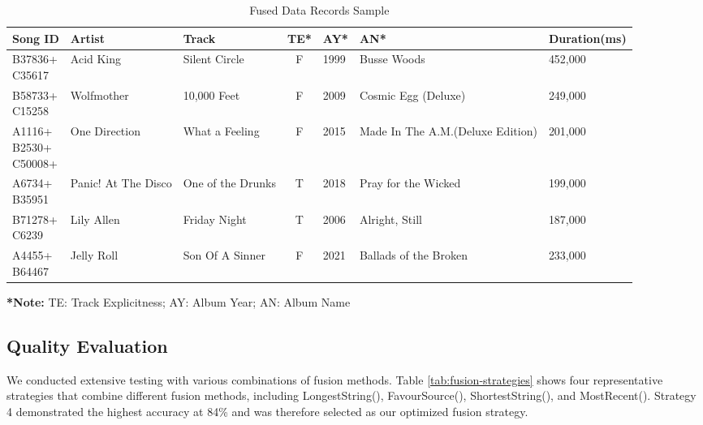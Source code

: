 \documentclass[runningheads]{llncs}
\begin{document}
\begin{table}[h!]
	\footnotesize  
	\centering     
	\renewcommand{\arraystretch}{1.3}
	\caption{Fused Data Records Sample}
	\label{tab:fused-data-samples}
	\begin{threeparttable}
	\begin{tabular}{p{1.5cm}p{1cm}p{1.5cm}cp{1cm}p{2cm}p{2cm}}
	\toprule
	\textbf{\centering Song ID} & \textbf{\centering Artist} & \textbf{\centering Track} & \textbf{\centering TE*} & \textbf{\centering AY*} & \textbf{\centering AN*} & \textbf{\centering Duration(ms)} \\[-0.3em]
	\midrule
	\parbox[t]{2cm}{B37836+\\C35617} & Acid King & Silent Circle & F & 1999 & Busse Woods & 452,000 \\
	\parbox[t]{2cm}{B58733+\\C15258} & Wolf\-mother & 10,000 Feet & F & 2009 & Cosmic Egg (Deluxe) & 249,000 \\
	\parbox[t]{2cm}{A1116+\\B2530+\\C50008}+ & One Direc\-tion & What a Feel\-ing & F & 2015 & Made In The A.M.\newline(Deluxe Edition) & 201,000 \\
	\parbox[t]{2cm}{A6734+\\B35951} & Panic! At The Disco & One of the Drunks & T & 2018 & Pray for the Wicked & 199,000 \\
	\parbox[t]{2cm}{B71278+\\C6239} & Lily Allen & Friday Night & T & 2006 & Alright, Still & 187,000 \\
	\parbox[t]{2cm}{A4455+\\B64467} & Jelly Roll & Son Of A Sin\-ner & F & 2021 & Ballads of the Bro\-ken & 233,000 \\
	\bottomrule
	\end{tabular}
	\begin{tablenotes}
		\footnotesize
		\item \textbf{*Note:} TE: Track Explicitness; AY: Album Year; AN: Album Name
		\end{tablenotes}
	\end{threeparttable}
	\end{table}

\subsection{Quality Evaluation}
We conducted extensive testing with various combinations of fusion methods. Table \ref{tab:fusion-strategies} shows four representative strategies that combine different fusion methods, including LongestString(), FavourSource(), ShortestString(), and MostRecent(). Strategy 4 demonstrated the highest accuracy at 84\% and was therefore selected as our optimized fusion strategy.
\end{document}

